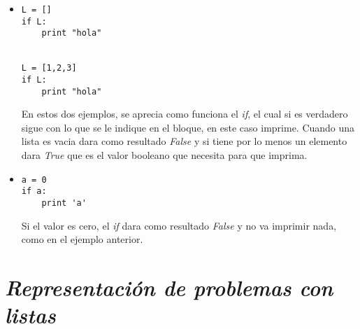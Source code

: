 \documentclass{book}
\begin{document}
\begin{itemize}
		
		\item \begin{lstlisting}
L = []
if L:
    print "hola"
		
		
L = [1,2,3]
if L:
    print "hola"   
		\end{lstlisting} En estos dos ejemplos, se aprecia como funciona el \textit{if}, el cual si es verdadero sigue con lo que se le indique en el bloque, en este caso imprime. Cuando una lista es vacia dara como resultado \textit{False} y si tiene por lo menos un elemento dara \textit{True} que es el valor booleano que necesita para que imprima.\\
		\item \begin{lstlisting}
a = 0 
if a: 
    print 'a'
		\end{lstlisting} Si el valor es cero, el \textit{if} dara como resultado \textit{False} y no va imprimir nada, como en el ejemplo anterior. 
		
		
		
	\end{itemize}
	
	
	
	
	
	
	






\section{\textit{Representación de problemas con listas}}

\begin{flushright}
	\date{24 de enero de 2019\\}
\end{flushright}

\end{document}
